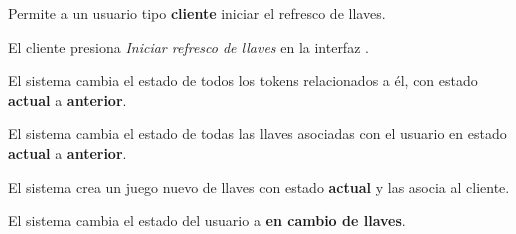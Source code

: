 %
%

{
  Permite a un usuario tipo \textbf{cliente} iniciar el refresco de llaves.

  \begin{trayectoriaPrincipal}

    \item El cliente presiona \textit{Iniciar refresco de llaves} en la interfaz
      .

    \item El sistema cambia el estado de todos los tokens relacionados a él, con
      estado \textbf{actual} a \textbf{anterior}.

    \item El sistema cambia el estado de todas las llaves asociadas con el
      usuario en estado \textbf{actual} a \textbf{anterior}.

    \item El sistema crea un juego nuevo de llaves con estado \textbf{actual}
      y las asocia al cliente.

    \item El sistema cambia el estado del usuario a
      \textbf{en cambio de llaves}.

  \end{trayectoriaPrincipal}
}
